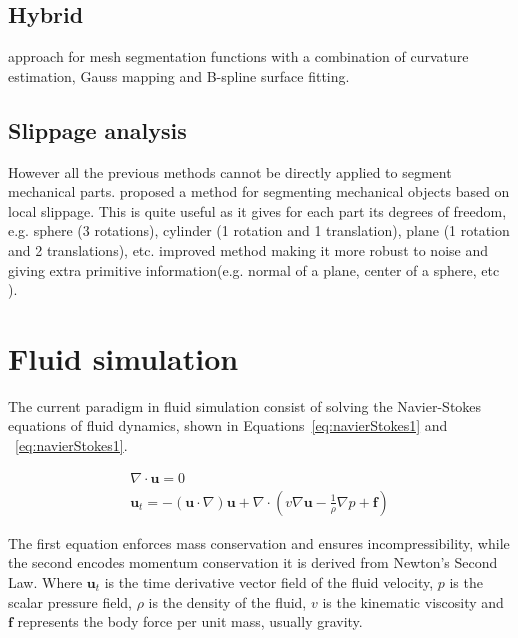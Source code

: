 \subsection{Hybrid}

\cite{Wang2011} approach for mesh segmentation functions with a combination of curvature estimation, Gauss mapping and B-spline surface fitting.

\subsection{Slippage analysis}

However all the previous methods cannot be directly applied to segment mechanical parts.
\cite{Gelfand2004} proposed a method for segmenting mechanical objects based on local slippage.
This is quite useful as it gives for each part its degrees of freedom, e.g. sphere (3 rotations), cylinder (1 rotation and 1 translation), plane (1 rotation and 2 translations), etc.
\cite{Yi2014} improved \cite{Gelfand2004} method making it more robust to noise and giving extra primitive information(e.g. normal of a plane, center of a sphere, etc ).



\section{Fluid simulation}
\label{prevWorkFluidSim}

The current paradigm in fluid simulation consist of solving the Navier-Stokes equations of fluid dynamics, shown in Equations~\ref{eq:navierStokes1} and  ~\ref{eq:navierStokes1}.

\begin{gather}
\label{eq:navierStokes1}
\nabla \cdot \mathbf{u} = 0\\
\label{eq:navierStokes2}
\mathbf{u}_t = -(\mathbf{u} \cdot \nabla)\mathbf{u} + \nabla \cdot ( v \nabla \mathbf{u} - \frac{1}{\rho} \nabla p + \mathbf{f} )
\end{gather}

The first equation enforces mass conservation and ensures incompressibility, while the second encodes momentum conservation it is derived from Newton's Second Law.
Where $\mathbf{u}_t$ is the time derivative vector field of the fluid velocity, $p$  is the scalar pressure field, $\rho$ is the density of the fluid, $v$ is the kinematic viscosity and $\mathbf{f}$ represents the body force per unit mass, usually gravity.\\

